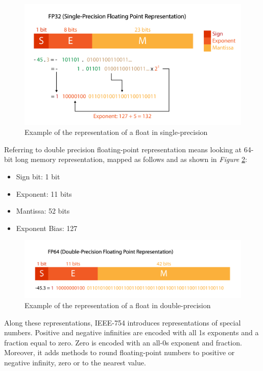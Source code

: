 \begin{figure}[htbp]
	\centering
		\includegraphics[width=.8\textwidth]{Figures/FP32.png}
	\caption[Single-precision Float Representation]{Example of the representation of a float in single-precision}
	\label{fig:FP32}
\end{figure}

Referring to double precision floating-point representation means looking at 64-bit long memory representation, mapped as follows and as shown in \emph{Figure} \ref{fig:FP64}:
\begin{itemize}
  \item Sign bit: 1 bit
  \item Exponent: 11 bits
  \item Mantissa: 52 bits
  \item Exponent Bias: 127
\end{itemize}

\begin{figure}[htbp]
	\centering
		\includegraphics[width=.8\textwidth]{Figures/FP64.png}
	\caption[Double-precision Float Representation]{Example of the representation of a float in double-precision}
	\label{fig:FP64}
\end{figure}

Along these representations, IEEE-754 introduces representations of special numbers. Positive and negative infinities are encoded with all 1s exponents and a fraction equal to zero. Zero is encoded with an all-0s exponent and fraction. Moreover, it adds methods to round floating-point numbers to positive or negative infinity, zero or to the nearest value.

